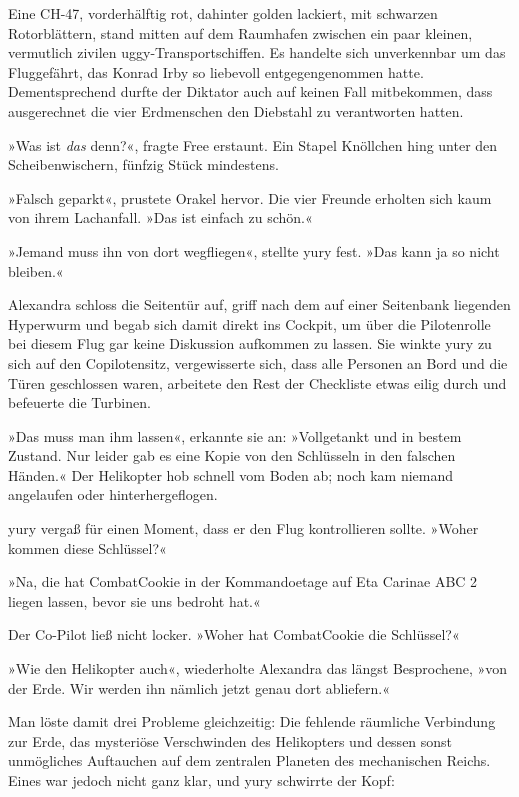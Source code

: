 Eine CH-47, vorderhälftig rot, dahinter golden lackiert, mit schwarzen Rotorblättern, stand mitten auf dem Raumhafen zwischen ein paar kleinen, vermutlich zivilen uggy-Transportschiffen. Es handelte sich unverkennbar um das Fluggefährt, das Konrad Irby so liebevoll entgegengenommen hatte. Dementsprechend durfte der Diktator auch auf keinen Fall mitbekommen, dass ausgerechnet die vier Erdmenschen den Diebstahl zu verantworten hatten.

»Was ist \emph{das} denn?«, fragte Free erstaunt. Ein Stapel Knöllchen hing unter den Scheibenwischern, fünfzig Stück mindestens.

»Falsch geparkt«, prustete Orakel hervor. Die vier Freunde erholten sich kaum von ihrem Lachanfall. »Das ist einfach zu schön.«

»Jemand muss ihn von dort wegfliegen«, stellte yury fest. »Das kann ja so nicht bleiben.«

Alexandra schloss die Seitentür auf, griff nach dem auf einer Seitenbank liegenden Hyperwurm und begab sich damit direkt ins Cockpit, um über die Pilotenrolle bei diesem Flug gar keine Diskussion aufkommen zu lassen. Sie winkte yury zu sich auf den Copilotensitz, vergewisserte sich, dass alle Personen an Bord und die Türen geschlossen waren, arbeitete den Rest der Checkliste etwas eilig durch und befeuerte die Turbinen.

»Das muss man ihm lassen«, erkannte sie an: »Vollgetankt und in bestem Zustand. Nur leider gab es eine Kopie von den Schlüsseln in den falschen Händen.« Der Helikopter hob schnell vom Boden ab; noch kam niemand angelaufen oder hinterhergeflogen.

yury vergaß für einen Moment, dass er den Flug kontrollieren sollte. »Woher kommen diese Schlüssel?«

»Na, die hat CombatCookie in der Kommandoetage auf Eta Carinae ABC 2 liegen lassen, bevor sie uns bedroht hat.«

Der Co-Pilot ließ nicht locker. »Woher hat CombatCookie die Schlüssel?«

»Wie den Helikopter auch«, wiederholte Alexandra das längst Besprochene, »von der Erde. Wir werden ihn nämlich jetzt genau dort abliefern.«

Man löste damit drei Probleme gleichzeitig: Die fehlende räumliche Verbindung zur Erde, das mysteriöse Verschwinden des Helikopters und dessen sonst unmögliches Auftauchen auf dem zentralen Planeten des mechanischen Reichs. Eines war jedoch nicht ganz klar, und yury schwirrte der Kopf:

